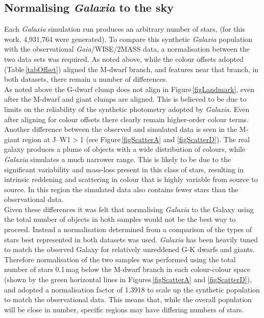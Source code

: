 \subsection{Normalising {\em Galaxia} to the sky}
\label{secNorm}
Each {\em Galaxia} simulation run produces an arbitrary number of stars, (for this work, 4,931,764 were generated). To compare this synthetic {\em Galaxia} population with the observational {\em Gaia}/WISE/2MASS data, a normalisation between the two data sets was required. As noted above, while the colour offsets adopted (Table\,\ref{tabOffset}) aligned the M-dwarf branch, and features near that branch, in both datasets, there remain  a number of differences.\\

As noted above the G-dwarf clump does not align in Figure\,\ref{figLandmark}, even after the M-dwarf and giant clumps are aligned. This is believed to be due to limits on the reliability of the synthetic photometry adopted by {\em Galaxia}. Even after aligning for colour offsets there clearly remain higher-order colour terms.\\

Another difference between the observed and simulated data is seen in the M-giant region at J--W1$>$1 (see Figure\,\ref{figScatterA} and \ref{figScatterD}). The real galaxy produces a plume of objects with a wide distribution of colours, while {\em Galaxia} simulates a much narrower range. This is likely to be due to the significant variability and mass-loss present in this class of stars, resulting in intrinsic reddening and scattering in colour that is highly variable from source to source. In this region the simulated data also contains fewer stars than the observational data.\\

Given these differences it was felt that normalising {\em Galaxia} to the Galaxy using the total number of objects in both samples would not be the best way to proceed. Instead a normalisation determined from a comparison of the types of stars best represented in both datasets was used. {\em Galaxia} has been heavily tuned to match the observed Galaxy for relatively unreddened G-K dwarfs and giants. Therefore normalisation of the two samples was performed using the total number of stars 0.1\,mag below the M-dwarf branch in each colour-colour space (shown by the green horizontal lines in Figures\,\ref{figScatterA} and \ref{figScatterD}), and adopted a normalisation factor of 1.3918 to scale up the synthetic population to match the observational data. This means that, while the overall population will be close in number, specific regions may have differing numbers of stars.


